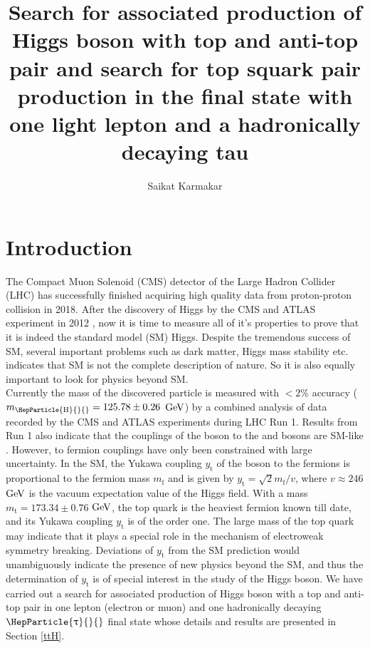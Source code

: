 \documentclass[11.5pt, a4paper]{article}
\title{Search for associated production of Higgs boson with top and anti-top pair and search for top squark pair production in the final state with one light lepton and a hadronically decaying tau}
\author{Saikat Karmakar}
\newcommand{\mf}{\ensuremath{m_{\mathrm{f}}}}
\newcommand{\yt}{\ensuremath{y_{\mathrm{t}}}}
\newcommand{\GeV}{\ensuremath{\text{Ge\hspace{-.08em}V}}{}\xspace}
\DeclareRobustCommand{\PW}{{\HepParticle{W}{}{}}\xspace}
\DeclareRobustCommand{\PH}{{\HepParticle{H}{}{}}\xspace}
\DeclareRobustCommand{\PZ}{{\HepParticle{Z}{}{}}\xspace}
\DeclareRobustCommand{\PGt}{{\HepParticle{\uptau}{}{}}\xspace} %
\begin{document}
\begin{titlepage}
\maketitle
\end{titlepage}

\section{Introduction}\label{intro}
The Compact Muon Solenoid (CMS) detector\cite{CMS:2008xjf} of the Large Hadron Collider (LHC) has successfully finished acquiring high quality data from proton-proton collision in 2018. After the discovery of Higgs by the CMS and ATLAS experiment in 2012  \cite{CMS:2012qbp,ATLAS:2012yve}, now it is time to measure all of it's properties to prove that it is indeed the standard model (SM) Higgs. Despite the tremendous success of SM, several important problems such as dark matter, Higgs mass stability etc. indicates that SM is not the complete description of nature. So it is also equally important to look for physics beyond SM.\\
Currently the mass of the discovered particle is measured with $< 2\%$ accuracy ($m_{\text{\PH}} = 125.78 \pm 0.26$ \GeV \cite{CMS:2020xrn}) by a combined analysis of data recorded by the CMS and ATLAS experiments during LHC Run 1. Results from Run 1 also indicate that the couplings of the \PH boson to the \PW and \PZ bosons are SM-like \cite{CMS:2014fzn}. However, \PH to fermion couplings have only been constrained with large uncertainty. In the SM, the Yukawa coupling $\yt$ of the \PH boson to the fermions is proportional to the fermion mass $\mf$  and is given by $\yt=\sqrt{2}\mf/v$, where $v\approx 246$ \GeV is the vacuum expectation value of the Higgs field. With a mass $m_{\text{t}}=173.34\pm 0.76$ \GeV\cite{ATLAS:2014wva}, the top quark is the heaviest fermion known till date, and its Yukawa coupling $\yt$ is of the order one. The large mass of the top quark may indicate that it plays a special role in the mechanism of electroweak symmetry breaking\cite{Dobrescu:1997nm,Chivukula:1998wd,Delepine:1995qs}. Deviations of $\yt$ from the SM prediction would unambiguously indicate the presence of new physics beyond the SM, and thus the determination of $\yt$ is of special interest in the study of the Higgs boson. We have carried out a search for associated production of Higgs boson with a top and anti-top pair in one lepton (electron or muon) and one hadronically decaying $\PGt$ final state whose details and results are presented in Section \ref{ttH}.\\
\end{document}
